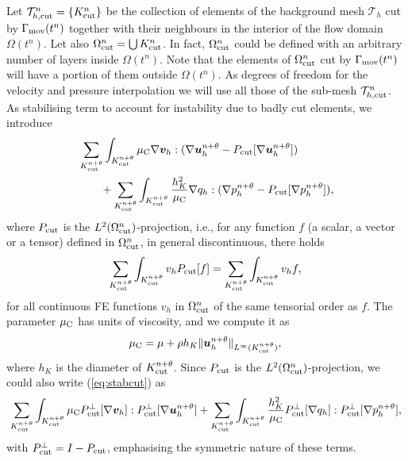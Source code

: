 \documentclass[11pt,a4paper,oneside,reqno]{amsart}
\newcommand{\Eq}[1]{(\ref{eq:#1})}
\def\u{{\bm u}}
\def\el{{\nonumber}}
\def\vt{\bm v}
\begin{document}
Let $\mathcal{T}^n_{h,{\rm cut}} = \{K^n_{\rm cut}\}$ be the collection of elements of the background mesh $\mathcal{T}_h$ cut by $\Gamma_{\rm mov}(t^n)$ together with their neighbours in the interior of the flow domain $\Omega(t^n)$. Let also $\Omega_{\rm cut}^n = \bigcup K_{\rm cut}^n$. In fact, $\Omega_{\rm cut}^n$ could be defined with an arbitrary number of layers inside $\Omega(t^n)$. Note that the elements of $\Omega_{\rm cut}^n$ cut by  $\Gamma_{\rm mov}(t^n)$ will have a portion of them outside $\Omega(t^n)$. As degrees of freedom for the velocity and pressure interpolation we will use all those of the sub-mesh $\mathcal{T}^n_{h,{\rm cut}}$. As stabilising term to account for instability due to badly cut elements, we introduce
\begin{align}
& \sum_{K^{n+\theta}_{\rm cut}} \int_{K^{n+\theta}_{\rm cut}}
\mu_{\rm C} \nabla \vt_h : (\nabla \u_h^{n+\theta} - P_{\rm cut}[\nabla \u_h^{n+\theta}])\nonumber\\
& \qquad + \sum_{K^{n+\theta}_{\rm cut}} \int_{K^{n+\theta}_{\rm cut}}
\frac{h_K^2}{\mu_{\rm C}} \nabla q_h : (\nabla p_h^{n+\theta} - P_{\rm cut}[\nabla p_h^{n+\theta}]),\label{eq:stabcut}
\end{align}
where $P_{\rm cut}$ is the $L^2(\Omega^n_{\rm cut})$-projection, i.e., for any function $f$ (a scalar, a vector or a tensor) defined in $\Omega^n_{\rm cut}$, in general discontinuous, there holds
\begin{align}
\sum_{K^{n+\theta}_{\rm cut}} \int_{K^{n+\theta}_{\rm cut}} v_h P_{\rm cut}[f] 
= \sum_{K^{n+\theta}_{\rm cut}} \int_{K^{n+\theta}_{\rm cut}} v_h f,\el
\end{align}
for all continuous FE functions $v_h$ in $\Omega^n_{\rm cut}$ of the same tensorial order as $f$. The parameter $\mu_{\rm C} $ has units of viscosity, and we compute it as
\begin{align}
\mu_{\rm C} = \mu + \rho  h_K \Vert \u_h^{n+\theta} %
\Vert_{L^\infty(K^{n+\theta}_{\rm cut})},\el
\end{align}
where $h_K$ is the diameter of $K^{n+\theta}_{\rm cut}$.  %
Since $P_{\rm cut}$ is the $L^2(\Omega^n_{\rm cut})$-projection, we could also write \Eq{stabcut} as
\begin{align}
\sum_{K^{n+\theta}_{\rm cut}} \int_{K^{n+\theta}_{\rm cut}}
\mu_{\rm C} P_{\rm cut}^\bot[\nabla \vt_h] : P_{\rm cut}^\bot[\nabla \u_h^{n+\theta} ]
+ \sum_{K^{n+\theta}_{\rm cut}} \int_{K^{n+\theta}_{\rm cut}}
\frac{h_K^2}{\mu_{\rm C}} P_{\rm cut}^\bot[\nabla q_h] : P_{\rm cut}^\bot[\nabla p_h^{n+\theta} ]
,\label{eq:stabcut2}
\end{align}
with $P_{\rm cut}^\bot = I - P_{\rm cut}$, emphasising the symmetric nature of these terms.
\end{document}
